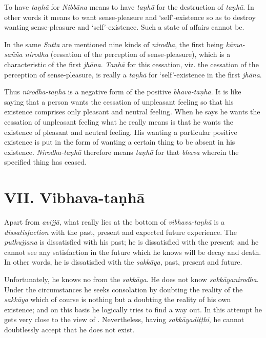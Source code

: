 To have \emph{taṇhā} for \emph{Nibbāna} means to have \emph{taṇhā} for the destruction of \emph{taṇhā}. In other words it means to want sense-pleasure and `self'-existence so as to destroy wanting sense-pleasure and `self'-existence. Such a state of affairs cannot be.

In the same \emph{Sutta} are mentioned nine kinds of \emph{nirodha}, the first being \emph{kāma-sañña nirodha} (cessation of the perception of sense-pleasure), which is a characteristic of the first \emph{jhāna}. \emph{Taṇhā} for this cessation, viz. the cessation of the perception of sense-pleasure, is really a \emph{taṇhā} for `self'-existence in the first \emph{jhāna}.

Thus \emph{nirodha-taṇhā} is a negative form of the positive \emph{bhava-taṇhā}. It is like saying that a person wants the cessation of unpleasant feeling so that his existence comprises only pleasant and neutral feeling. When he says he wants the cessation of unpleasant feeling what he really means is that he wants the existence of pleasant and neutral feeling. His wanting a particular positive existence is put in the form of wanting a certain thing to be absent in his existence. \emph{Nirodha-taṇhā} therefore means \emph{taṇhā} for that \emph{bhava} wherein the specified thing has ceased.

\section{VII. Vibhava-taṇhā}

\protect\hypertarget{vibhava-tanha}{}{}Apart from \emph{avijjā}, what really lies at the bottom of \emph{vibhava-taṇhā} is a \emph{dissatisfaction} with the past, present and expected future experience. The \emph{puthujjana} is dissatisfied with his past; he is dissatisfied with the present; and he cannot see any satisfaction in the future which he knows will be decay and death. In other words, he is dissatisfied with the \emph{sakkāya}, past, present and future.

Unfortunately, he knows no  from the \emph{sakkāya}. He does not know \emph{sakkāyanirodha}. Under the circumstances he seeks consolation by doubting the reality of the \emph{sakkāya} which of course is nothing but a doubting the reality of his own existence; and on this basis he logically tries to find a way out. In this attempt he gets very close to the view of . Nevertheless, having \emph{sakkāyadiṭṭhi}, he cannot doubtlessly accept that he does not exist.

